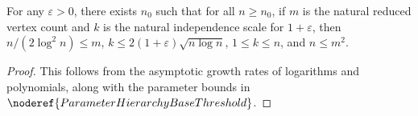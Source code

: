 \begin{lemma}\label{ProjectionSizeAnalyticParameterBounds}
For any $\varepsilon > 0$, there exists $n_0$ such that for all $n \ge n_0$, if $m$ is the natural reduced vertex count and $k$ is the natural independence scale for $1+\varepsilon$, then $n / (2 \log^2 n) \le m$, $k \le 2(1+\varepsilon)\sqrt{n \log n}$, $1 \le k \le n$, and $n \le m^2$.
\end{lemma}
\begin{proof}
This follows from the asymptotic growth rates of logarithms and polynomials, along with the parameter bounds in \(\noderef{ParameterHierarchyBaseThreshold}\).
\end{proof}
